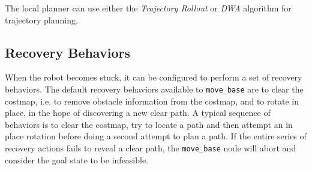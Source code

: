 The local planner can use either the \textit{Trajectory Rollout} or \textit{\ac{DWA}} algorithm for trajectory planning.

\subsection{Recovery Behaviors}

When the robot becomes stuck, it can be configured to perform a set of recovery behaviors. The default recovery behaviors available to \texttt{move\_base} are to clear the costmap, i.e. to remove obstacle information from the costmap, and to rotate in place, in the hope of discovering a new clear path. A typical sequence of behaviors is to clear the costmap, try to locate a path and then attempt an in place rotation before doing a second attempt to plan a path. If the entire series of recovery actions fails to reveal a clear path, the \texttt{move\_base} node will abort and consider the goal state to be infeasible\cite{koubaa2016robot}.